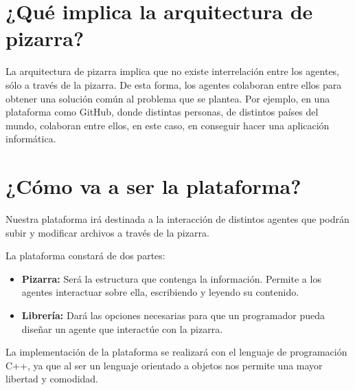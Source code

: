 \section{¿Qué implica la arquitectura de pizarra?}
La arquitectura de pizarra implica que no existe interrelación entre los agentes, sólo a través de la pizarra. De esta forma, los agentes colaboran entre ellos para obtener una solución común al problema que se plantea. Por ejemplo, en una plataforma como GitHub, donde distintas personas, de distintos países del mundo, colaboran entre ellos, en este caso, en conseguir hacer una aplicación informática. 

\section{¿Cómo va a ser la plataforma?}
Nuestra plataforma irá destinada a la interacción de distintos agentes que podrán subir y modificar archivos a través de la pizarra.

La plataforma constará de dos partes:
\begin{itemize}
	\item \textbf{Pizarra: }Será la estructura que contenga la información. Permite a los agentes interactuar sobre ella, escribiendo y leyendo su contenido.
	\item \textbf{Librería: }Dará las opciones necesarias para que un programador pueda diseñar un agente que interactúe con la pizarra. 
\end{itemize}

La implementación de la plataforma se realizará con el lenguaje de programación C++, ya que al ser un lenguaje orientado a objetos nos permite una mayor libertad y comodidad.
